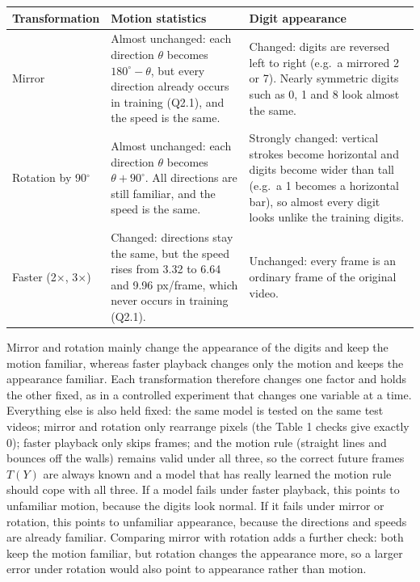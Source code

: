 \begin{table}[H]
\centering\small
\begin{tabularx}{\textwidth}{@{}p{2.6cm}YY@{}}
\toprule
\textbf{Transformation} & \textbf{Motion statistics} & \textbf{Digit appearance}\\
\midrule
Mirror & Almost unchanged: each direction $\theta$ becomes $180^\circ-\theta$, but every direction already occurs in training (Q2.1), and the speed is the same. & Changed: digits are reversed left to right (e.g.\ a mirrored 2 or 7). Nearly symmetric digits such as 0, 1 and 8 look almost the same.\\
Rotation by 90$^\circ$ & Almost unchanged: each direction $\theta$ becomes $\theta+90^\circ$. All directions are still familiar, and the speed is the same. & Strongly changed: vertical strokes become horizontal and digits become wider than tall (e.g.\ a 1 becomes a horizontal bar), so almost every digit looks unlike the training digits.\\
Faster (2$\times$, 3$\times$) & Changed: directions stay the same, but the speed rises from 3.32 to 6.64 and 9.96 px/frame, which never occurs in training (Q2.1). & Unchanged: every frame is an ordinary frame of the original video.\\
\bottomrule
\end{tabularx}
\end{table}
Mirror and rotation mainly change the appearance of the digits and keep the motion familiar, whereas faster playback changes only the motion and keeps the appearance familiar. Each transformation therefore changes one factor and holds the other fixed, as in a controlled experiment that changes one variable at a time. Everything else is also held fixed: the same model is tested on the same test videos; mirror and rotation only rearrange pixels (the Table 1 checks give exactly 0); faster playback only skips frames; and the motion rule (straight lines and bounces off the walls) remains valid under all three, so the correct future frames $T(Y)$ are always known and a model that has really learned the motion rule should cope with all three. If a model fails under faster playback, this points to unfamiliar motion, because the digits look normal. If it fails under mirror or rotation, this points to unfamiliar appearance, because the directions and speeds are already familiar. Comparing mirror with rotation adds a further check: both keep the motion familiar, but rotation changes the appearance more, so a larger error under rotation would also point to appearance rather than motion.

